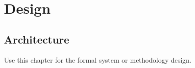 \chapter{Design}
\label{chap:design}

\section{Architecture}
\label{sec:architecture}

Use this chapter for the formal system or methodology design.
